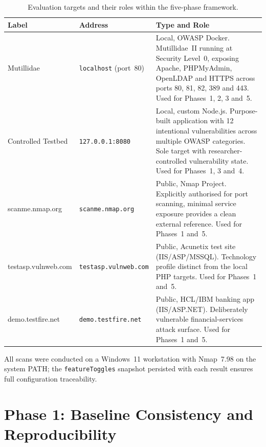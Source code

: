 \documentclass[12pt, a4paper, oneside]{report}
\begin{document}
\begin{table}[H]
\centering
\caption{Evaluation targets and their roles within the five-phase framework.}
\label{tab:eval-targets}
\footnotesize
\renewcommand{\arraystretch}{1.45}
\setlength{\tabcolsep}{4pt}
\begin{tabularx}{\textwidth}{
  >{\raggedright\arraybackslash}p{3.8cm}
  >{\raggedright\arraybackslash}p{3.6cm}
  >{\raggedright\arraybackslash}X}
\toprule
\rowcolor{headerblue}
\textcolor{headertext}{\textbf{Label}} &
\textcolor{headertext}{\textbf{Address}} &
\textcolor{headertext}{\textbf{Type and Role}} \\
\midrule
\rowcolor{rowlight}
Mutillidae &
\texttt{localhost} (port~80) &
Local, OWASP Docker. Mutillidae~II running at Security Level~0, exposing
Apache, PHPMyAdmin, OpenLDAP and HTTPS across ports 80, 81, 82, 389 and 443.
Used for Phases~1, 2, 3 and~5. \\
\rowcolor{rowwhite}
Controlled Testbed &
\texttt{127.0.0.1:8080} &
Local, custom Node.js. Purpose-built application with 12 intentional
vulnerabilities across multiple OWASP categories. Sole target with
researcher-controlled vulnerability state. Used for Phases~1, 3 and~4. \\
\rowcolor{rowlight}
scanme.nmap.org &
\texttt{scanme.nmap.org} &
Public, Nmap Project. Explicitly authorised for port scanning, minimal service
exposure provides a clean external reference. Used for Phases~1 and~5. \\
\rowcolor{rowwhite}
testasp.vulnweb.com &
\texttt{testasp.vulnweb.com} &
Public, Acunetix test site (IIS/ASP/MSSQL). Technology profile distinct from
the local PHP targets. Used for Phases~1 and~5. \\
\rowcolor{rowlight}
demo.testfire.net &
\texttt{demo.testfire.net} &
Public, HCL/IBM banking app (IIS/ASP.NET). Deliberately vulnerable
financial-services attack surface. Used for Phases~1 and~5. \\
\bottomrule
\end{tabularx}
\renewcommand{\arraystretch}{1.0}
\end{table}

All scans were conducted on a Windows~11 workstation with Nmap~7.98 on the system PATH; the \texttt{featureToggles} snapshot persisted with each result ensures full configuration traceability.

\section{Phase 1: Baseline Consistency and Reproducibility}
\label{sec:phase1-results}
\end{document}
